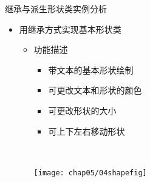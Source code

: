 \begin{frame}[t, fragile]{继承与派生}{形状类实例分析}%
  \stretchon
  \begin{itemize}
  \item 用继承方式实现基本形状类
    \begin{itemize}
    \item 功能描述\\
      \begin{minipage}{0.55\linewidth}
        \begin{itemize}
        \item 带文本的基本形状绘制
        \item 可更改文本和形状的颜色
        \item 可更改形状的大小
        \item 可上下左右移动形状
        \end{itemize}
      \end{minipage}\\%
      \centering
      \begin{minipage}{0.75\linewidth}
        \texttt{[image: chap05/04shapefig]}
      \end{minipage}
    \end{itemize}
  \end{itemize}
  \stretchoff
\end{frame}

